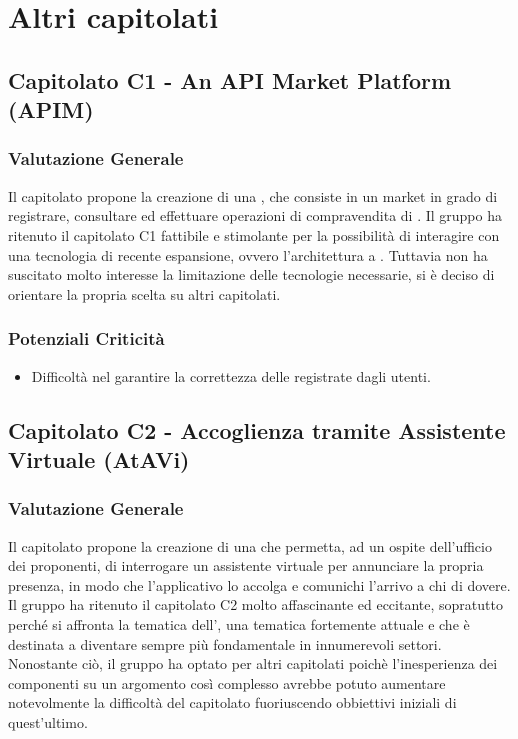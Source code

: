 \section{Altri capitolati}
  \subsection{Capitolato C1 - An API Market Platform (APIM)}
    \subsubsection{Valutazione Generale}
    Il capitolato propone la creazione di una , che consiste in un  market in grado di registrare, consultare ed effettuare operazioni di compravendita di .
    Il gruppo ha ritenuto il capitolato C1 fattibile e stimolante per la possibilità di interagire con una tecnologia di recente espansione, ovvero l'architettura a . Tuttavia non ha suscitato molto interesse la limitazione delle tecnologie necessarie, si è deciso di orientare la propria scelta su altri capitolati.
    \subsubsection{Potenziali Criticità}
     \begin{itemize}
      \item Difficoltà nel garantire la correttezza delle  registrate dagli utenti.
     \end{itemize}
  \subsection{Capitolato C2 - Accoglienza tramite Assistente Virtuale (AtAVi)}
    \subsubsection{Valutazione Generale}
    Il capitolato propone la creazione di una  che permetta, ad un ospite dell'ufficio dei proponenti, di interrogare un assistente virtuale per annunciare la propria presenza, in modo che l'applicativo lo accolga e comunichi l'arrivo a chi di dovere.
    Il gruppo ha ritenuto il capitolato C2 molto affascinante ed eccitante, sopratutto perché si affronta la tematica dell', una tematica fortemente attuale e che è destinata a diventare sempre più fondamentale in innumerevoli settori. Nonostante ciò, il gruppo ha optato per altri capitolati poichè l'inesperienza dei componenti su un argomento così complesso avrebbe potuto aumentare notevolmente la difficoltà del capitolato fuoriuscendo obbiettivi iniziali di quest'ultimo.
